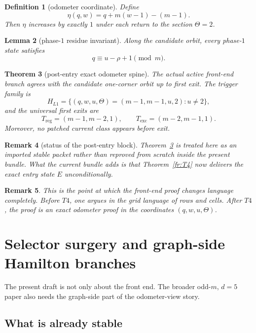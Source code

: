 \documentclass[11pt]{article}
\newtheorem{theorem}{Theorem}[section]
\newtheorem{lemma}[theorem]{Lemma}
\newtheorem{remark}[theorem]{Remark}
\newtheorem{definition}[theorem]{Definition}
\begin{document}
\begin{definition}[odometer coordinate]
Define
\[
\eta(q,w)=q+m(w-1)-(m-1).
\]
Then \(\eta\) increases by exactly \(1\) under each return to the section
\(\Theta=2\).
\end{definition}

\begin{lemma}[phase-$1$ residue invariant]
Along the candidate orbit, every phase-$1$ state satisfies
\[
q\equiv u-\rho+1 \pmod m.
\]
\end{lemma}

\begin{theorem}[post-entry exact odometer spine]
\label{thm:odometer-spine}
The actual active front-end branch agrees with the candidate one-corner
orbit up to first exit.
The trigger family is
\[
H_{L1}=\{(q,w,u,\Theta)=(m-1,m-1,u,2):u\neq 2\},
\]
and the universal first exits are
\[
T_{\mathrm{reg}}=(m-1,m-2,1),
\qquad
T_{\mathrm{exc}}=(m-2,m-1,1).
\]
Moreover, no patched current class appears before exit.
\end{theorem}

\begin{remark}[status of the post-entry block]
Theorem~\ref{thm:odometer-spine} is treated here as an imported stable packet
rather than reproved from scratch inside the present bundle.  What the current
bundle adds is that Theorem~\ref{fr:T4} now delivers the exact entry state
\(E\) unconditionally.
\end{remark}

\begin{remark}
This is the point at which the front-end proof changes language completely.
Before \(T4\), one argues in the grid language of rows and cells.
After \(T4\), the proof is an exact odometer proof in the coordinates
\((q,w,u,\Theta)\).
\end{remark}

\section{Selector surgery and graph-side Hamilton branches}
\label{sec:selector-surgery}

The present draft is not only about the front end.
The broader odd-$m$, $d=5$ paper also needs the graph-side part of the
odometer-view story.

\subsection{What is already stable}
\end{document}
